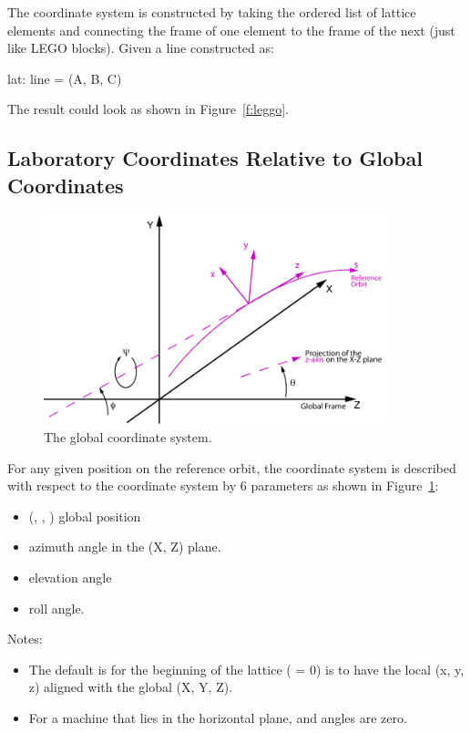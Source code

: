 \documentclass{hitec}
\begin{document}
The  coordinate system is constructed by taking the ordered list of lattice elements and
connecting the  frame of one element to the  frame of the next (just like LEGO
blocks). Given a line constructed as:
{\small
\begin{code}
    lat: line = (A, B, C)
\end{code}}
The result could look as shown in Figure~\ref{f:leggo}.

\subsection{Laboratory Coordinates Relative to Global Coordinates}

\begin{figure}[tb]
  \centering
  \includegraphics[width=0.9\textwidth]{global-coords.pdf}
  \caption{The global coordinate system.}
  \label{f:global}
\end{figure}

For any given position on the reference orbit, the  coordinate system is described with
respect to the  coordinate system by 6 parameters as shown in Figure~\ref{f:global}:
\begin{itemize}
\item (, , ) global position
\item \vn{$\theta$} azimuth angle in the (X, Z) plane.
\item \vn{$\phi$} elevation angle
\item \vn{$\psi$} roll angle.
\end{itemize}

Notes:
\begin{itemize}
\item The default is for the beginning of the lattice ( = 0) is to have the local (x, y, z) aligned with the 
global (X, Y, Z).
\item For a machine that lies in the horizontal plane, \vn{$\phi$} and \vn{$\psi$} angles are zero.
\end{itemize}
\end{document}
